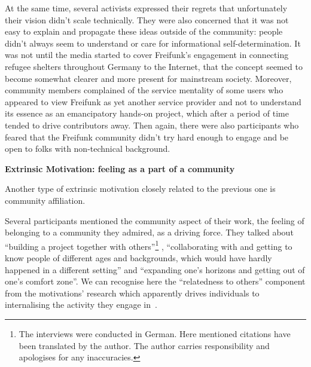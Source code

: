 At the same time, several activists expressed their regrets that unfortunately their vision didn't scale technically.
They were also concerned that it was not easy to explain and propagate these ideas outside of the community: people didn't always seem to understand or care for informational self-determination.
It was not until the media started to cover Freifunk's engagement in connecting refugee shelters throughout Germany to the Internet, that the concept seemed to become somewhat clearer and more present for mainstream society.
Moreover, community members complained of the service mentality of some users who appeared to view Freifunk as yet another service provider and not to understand its essence as an emancipatory hands-on project, which after a period of time tended to drive contributors away.
Then again, there were also participants who feared that the Freifunk community didn't try hard enough to engage and be open to folks with non-technical background.

\begin{comment}
Although net neutrality is one of the key principles in the Pico-Peering-Agreement, the minimal consensus paper/document(?) for all Freifunk communities/free network projects, not all of the survey participants interpreted the notion the same way, nor did they grant it equal importance.
\end{comment}


\textbf{Extrinsic Motivation: feeling as a part of a community}

Another type of extrinsic motivation closely related to the previous one is community affiliation.

Several participants mentioned the community aspect of their work, the feeling of belonging to a community they admired, as a driving force.
They talked about ``building a project together with others''\footnote{The interviews were conducted in German. Here mentioned citations have been translated by the author. The author carries responsibility and apologises for any inaccuracies.}
, ``collaborating with and getting to know people of different ages and backgrounds, which would have hardly happened in a different setting'' and ``expanding one's horizons and getting out of one's comfort zone''.
We can recognise here the ``relatedness to others'' component from the motivations' research which apparently drives individuals to internalising the activity they engage in~\cite{RyDe2000}.

